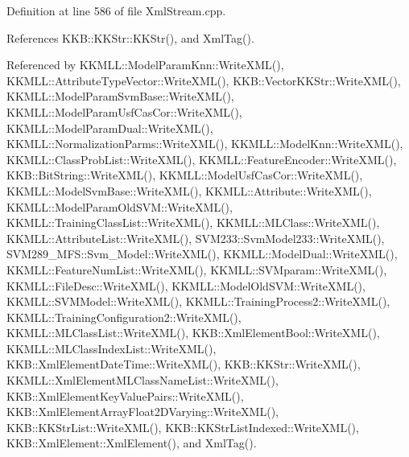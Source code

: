 Definition at line 586 of file Xml\+Stream.\+cpp.



References K\+K\+B\+::\+K\+K\+Str\+::\+K\+K\+Str(), and Xml\+Tag().



Referenced by K\+K\+M\+L\+L\+::\+Model\+Param\+Knn\+::\+Write\+X\+M\+L(), K\+K\+M\+L\+L\+::\+Attribute\+Type\+Vector\+::\+Write\+X\+M\+L(), K\+K\+B\+::\+Vector\+K\+K\+Str\+::\+Write\+X\+M\+L(), K\+K\+M\+L\+L\+::\+Model\+Param\+Svm\+Base\+::\+Write\+X\+M\+L(), K\+K\+M\+L\+L\+::\+Model\+Param\+Usf\+Cas\+Cor\+::\+Write\+X\+M\+L(), K\+K\+M\+L\+L\+::\+Model\+Param\+Dual\+::\+Write\+X\+M\+L(), K\+K\+M\+L\+L\+::\+Normalization\+Parms\+::\+Write\+X\+M\+L(), K\+K\+M\+L\+L\+::\+Model\+Knn\+::\+Write\+X\+M\+L(), K\+K\+M\+L\+L\+::\+Class\+Prob\+List\+::\+Write\+X\+M\+L(), K\+K\+M\+L\+L\+::\+Feature\+Encoder\+::\+Write\+X\+M\+L(), K\+K\+B\+::\+Bit\+String\+::\+Write\+X\+M\+L(), K\+K\+M\+L\+L\+::\+Model\+Usf\+Cas\+Cor\+::\+Write\+X\+M\+L(), K\+K\+M\+L\+L\+::\+Model\+Svm\+Base\+::\+Write\+X\+M\+L(), K\+K\+M\+L\+L\+::\+Attribute\+::\+Write\+X\+M\+L(), K\+K\+M\+L\+L\+::\+Model\+Param\+Old\+S\+V\+M\+::\+Write\+X\+M\+L(), K\+K\+M\+L\+L\+::\+Training\+Class\+List\+::\+Write\+X\+M\+L(), K\+K\+M\+L\+L\+::\+M\+L\+Class\+::\+Write\+X\+M\+L(), K\+K\+M\+L\+L\+::\+Attribute\+List\+::\+Write\+X\+M\+L(), S\+V\+M233\+::\+Svm\+Model233\+::\+Write\+X\+M\+L(), S\+V\+M289\+\_\+\+M\+F\+S\+::\+Svm\+\_\+\+Model\+::\+Write\+X\+M\+L(), K\+K\+M\+L\+L\+::\+Model\+Dual\+::\+Write\+X\+M\+L(), K\+K\+M\+L\+L\+::\+Feature\+Num\+List\+::\+Write\+X\+M\+L(), K\+K\+M\+L\+L\+::\+S\+V\+Mparam\+::\+Write\+X\+M\+L(), K\+K\+M\+L\+L\+::\+File\+Desc\+::\+Write\+X\+M\+L(), K\+K\+M\+L\+L\+::\+Model\+Old\+S\+V\+M\+::\+Write\+X\+M\+L(), K\+K\+M\+L\+L\+::\+S\+V\+M\+Model\+::\+Write\+X\+M\+L(), K\+K\+M\+L\+L\+::\+Training\+Process2\+::\+Write\+X\+M\+L(), K\+K\+M\+L\+L\+::\+Training\+Configuration2\+::\+Write\+X\+M\+L(), K\+K\+M\+L\+L\+::\+M\+L\+Class\+List\+::\+Write\+X\+M\+L(), K\+K\+B\+::\+Xml\+Element\+Bool\+::\+Write\+X\+M\+L(), K\+K\+M\+L\+L\+::\+M\+L\+Class\+Index\+List\+::\+Write\+X\+M\+L(), K\+K\+B\+::\+Xml\+Element\+Date\+Time\+::\+Write\+X\+M\+L(), K\+K\+B\+::\+K\+K\+Str\+::\+Write\+X\+M\+L(), K\+K\+M\+L\+L\+::\+Xml\+Element\+M\+L\+Class\+Name\+List\+::\+Write\+X\+M\+L(), K\+K\+B\+::\+Xml\+Element\+Key\+Value\+Pairs\+::\+Write\+X\+M\+L(), K\+K\+B\+::\+Xml\+Element\+Array\+Float2\+D\+Varying\+::\+Write\+X\+M\+L(), K\+K\+B\+::\+K\+K\+Str\+List\+::\+Write\+X\+M\+L(), K\+K\+B\+::\+K\+K\+Str\+List\+Indexed\+::\+Write\+X\+M\+L(), K\+K\+B\+::\+Xml\+Element\+::\+Xml\+Element(), and Xml\+Tag().


